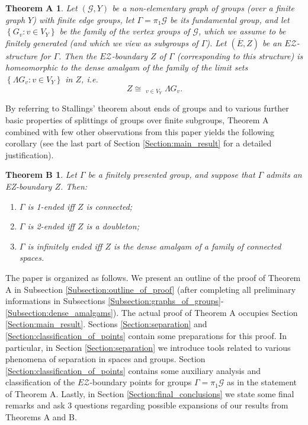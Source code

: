 \documentclass[12pt, a4paper]{article}
\newcommand{\8}{\infty}
\newcommand{\set}[1]{\left\{ #1 \right\}}
\theoremstyle{break}
\newtheorem*{thma*}{Theorem A}
\newtheorem*{thmb*}{Theorem B}
\theoremstyle{defbreak}
\newcommand{\ol}[1]{\overline{#1}}
\DeclareMathOperator*{\damalgam}{\widetilde{\bigsqcup}}
\begin{document}
\bigskip
\begin{thma*}\label{thma}
Let $(\mathcal{G},Y)$ be a non-elementary graph of groups (over a finite graph $Y$) with finite
edge groups, let $\Gamma=\pi_1\mathcal{G}$ be its fundamental group,
and let $\set{G_v:v\in V_Y}$ be the family of the vertex groups of $\mathcal{G}$, which we assume to be finitely generated
(and which we view as subgroups of $\Gamma$). Let $(\ol{E},Z)$ be an
$E\mathcal{Z}$-structure for $\Gamma$. Then the $E\mathcal{Z}$-boundary
$Z$ of $\Gamma$ (corresponding to this structure) is homeomorphic to
the dense amalgam of the family of the limit sets $\set{\Lambda G_v:v\in V_Y}$
in $Z$, i.e. $$Z\cong\damalgam_{v\in V_Y}\Lambda G_v.$$
\end{thma*}



By referring to Stallings' theorem about ends of groups
and to various further basic properties of splittings of groups over finite subgroups,
Theorem A combined with few other observations from
this paper yields the following corollary (see the last part of Section \ref{Section:main_result} 
for a detailed justification).

\medskip
\begin{thmb*}
Let $\Gamma$ be a finitely presented group, and suppose that
$\Gamma$ admits an EZ-boundary $Z$. Then:
\begin{enumerate}
\item
$\Gamma$ is 1-ended iff $Z$ is connected;
\item
$\Gamma$ is 2-ended iff $Z$ is a doubleton;
\item
$\Gamma$ is infinitely ended iff $Z$ is the dense amalgam of a family of connected spaces. 

\end{enumerate}

\end{thmb*}




The paper is organized as follows.
We present an outline of the proof of Theorem A in Subsection \ref{Subsection:outline_of_proof}
(after completing all preliminary informations in Subsections \ref{Subsection:graphs_of_groups}-\ref{Subsection:dense_amalgams}).
The actual proof of Theorem A occupies Section \ref{Section:main_result}. Sections \ref{Section:separation} and \ref{Section:classification_of_points} 
contain some preparations for this proof. In particular, in Section \ref{Section:separation} we 
introduce tools related to various phenomena of separation in spaces
and groups. Section \ref{Section:classification_of_points} contains some auxiliary analysis and classification of the 
$E\mathcal{Z}$-boundary points
for groups $\Gamma=\pi_1\mathcal{G}$ as in the statement of Theorem A. Lastly, in Section \ref{Section:final_conclusions} we state some final remarks and ask $3$ questions regarding possible expansions of our results from Theorems A and B.
\end{document}
